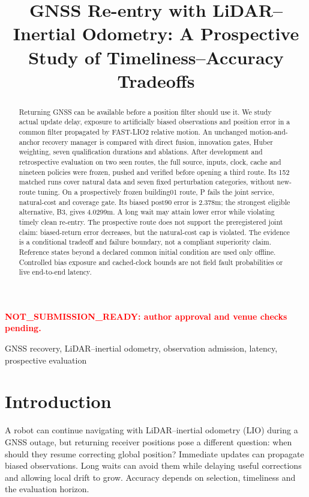 \documentclass[conference]{IEEEtran}
\title{GNSS Re-entry with LiDAR--Inertial Odometry: A Prospective Study of Timeliness--Accuracy Tradeoffs}
\author{\IEEEauthorblockN{Internal author-review draft: authors and affiliations unassigned}}
\newcommand{\reviewmark}{\textcolor{red}{\textbf{NOT\_SUBMISSION\_READY: author approval and venue checks pending.}}}
\begin{document}
\maketitle
\begin{center}\small\reviewmark\end{center}
\begin{abstract}
Returning GNSS can be available before a position filter should use it. We study actual update delay, exposure to artificially biased observations and position error in a common filter propagated by FAST-LIO2 relative motion. An unchanged motion-and-anchor recovery manager is compared with direct fusion, innovation gates, Huber weighting, seven qualification durations and ablations. After development and retrospective evaluation on two seen routes, the full source, inputs, clock, cache and nineteen policies were frozen, pushed and verified before opening a third route. Its 152 matched runs cover natural data and seven fixed perturbation categories, without new-route tuning. On a prospectively frozen building01 route, P fails the joint service, natural-cost and coverage gate. Its biased post90 error is 2.378m; the strongest eligible alternative, B3, gives 4.0299m. A long wait may attain lower error while violating timely clean re-entry. The prospective route does not support the preregistered joint claim: biased-return error decreases, but the natural-cost cap is violated. The evidence is a conditional tradeoff and failure boundary, not a compliant superiority claim. Reference states beyond a declared common initial condition are used only offline. Controlled bias exposure and cached-clock bounds are not field fault probabilities or live end-to-end latency.
\end{abstract}
\begin{IEEEkeywords}GNSS recovery, LiDAR--inertial odometry, observation admission, latency, prospective evaluation\end{IEEEkeywords}

\section{Introduction}
A robot can continue navigating with LiDAR--inertial odometry (LIO) during a GNSS outage, but returning receiver positions pose a different question: when should they resume correcting global position? Immediate updates can propagate biased observations. Long waits can avoid them while delaying useful corrections and allowing local drift to grow. Accuracy depends on selection, timeliness and the evaluation horizon.
\end{document}
